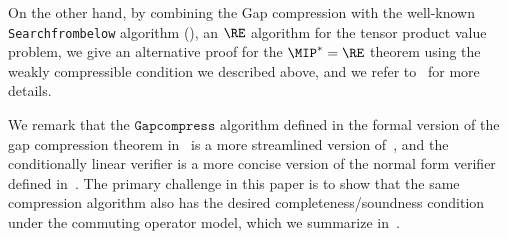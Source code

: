 
On the other hand, by combining the Gap compression with the well-known \texttt{Searchfrombelow} algorithm (), an $\RE$ algorithm for the tensor product value problem, we give an alternative proof for the $\MIP^*= \RE$ theorem using the weakly compressible condition we described above, and we refer to~ for more details. 

We remark that the $\texttt{Gapcompress}$ algorithm defined in the formal version of the gap compression theorem in~ is a more streamlined version of~\cite[Theorem 12.1]{jiMIPRE2022a}, and the conditionally linear verifier is a more concise version of the normal form verifier defined in~\cite[Definition 5.31]{jiMIPRE2022a}. The primary challenge in this paper is to show that the same compression algorithm also has the desired completeness/soundness condition under the commuting operator model, which we summarize in~.


